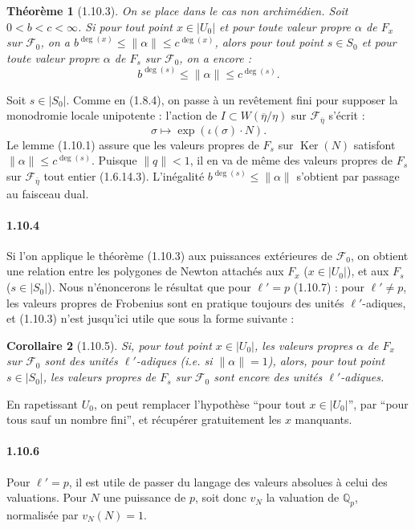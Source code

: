 \documentclass[12pt,a4paper]{article}
\theoremstyle{plain}
\newtheorem{theorem}{Th\'eor\`eme}[section]
\newtheorem{corollary}[theorem]{Corollaire}
\theoremstyle{definition}
\theoremstyle{remark}
\DeclareMathOperator{\Ker}{Ker}
\newcommand{\QQ}{{\mathbb{Q}}}
\begin{document}
\begin{theorem}[1.10.3]
On se place dans le cas non archim\'edien. Soit $0 < b < c < \infty$. Si pour tout point $x \in |U_0|$ et pour toute valeur propre $\alpha$ de $F_x$ sur $\mathscr{F}_0$, on a $b^{\deg(x)} \leq \|\alpha\| \leq c^{\deg(x)}$, alors pour tout point $s \in S_0$ et pour toute valeur propre $\alpha$ de $F_s$ sur $\mathscr{F}_0$, on a encore :
\[ b^{\deg(s)} \leq \|\alpha\| \leq c^{\deg(s)}. \]
\end{theorem}

Soit $s \in |S_0|$. Comme en (1.8.4), on passe \`a un rev\^etement fini pour supposer la monodromie locale unipotente : l'action de $I \subset W(\overline{\eta}/\eta)$ sur $\mathscr{F}_{\overline{\eta}}$ s'\'ecrit :
\[ \sigma \mapsto \exp(\iota(\sigma) \cdot N). \]
Le lemme (1.10.1) assure que les valeurs propres de $F_s$ sur $\Ker(N)$ satisfont $\|\alpha\| \leq c^{\deg(s)}$. Puisque $\|q\| < 1$, il en va de m\^eme des valeurs propres de $F_s$ sur $\mathscr{F}_{\overline{\eta}}$ tout entier (1.6.14.3). L'in\'egalit\'e $b^{\deg(s)} \leq \|\alpha\|$ s'obtient par passage au faisceau dual.

\paragraph{1.10.4}
Si l'on applique le th\'eor\`eme (1.10.3) aux puissances ext\'erieures de $\mathscr{F}_0$, on obtient une relation entre les polygones de Newton attach\'es aux $F_x$ ($x \in |U_0|$), et aux $F_s$ ($s \in |S_0|$). Nous n'\'enoncerons le r\'esultat que pour $\ell' = p$ (1.10.7) : pour $\ell' \neq p$, les valeurs propres de Frobenius sont en pratique toujours des unit\'es $\ell'$-adiques, et (1.10.3) n'est jusqu'ici utile que sous la forme suivante :


\begin{corollary}[1.10.5]
Si, pour tout point $x \in |U_0|$, les valeurs propres $\alpha$ de $F_x$ sur $\mathscr{F}_0$ sont des unit\'es $\ell'$-adiques (i.e. si $\|\alpha\| = 1$), alors, pour tout point $s \in |S_0|$, les valeurs propres de $F_s$ sur $\mathscr{F}_0$ sont encore des unit\'es $\ell'$-adiques.
\end{corollary}

En rapetissant $U_0$, on peut remplacer l'hypoth\`ese ``pour tout $x \in |U_0|$'', par ``pour tous sauf un nombre fini'', et r\'ecup\'erer gratuitement les $x$ manquants.

\paragraph{1.10.6}
Pour $\ell' = p$, il est utile de passer du langage des valeurs absolues \`a celui des valuations. Pour $N$ une puissance de $p$, soit donc $v_N$ la valuation de $\QQ_p$, normalis\'ee par $v_N(N) = 1$.
\end{document}
